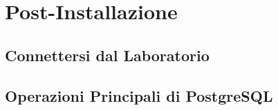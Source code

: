 \chapter{Post-Installazione}

\section{Connettersi dal Laboratorio}

\section{Operazioni Principali di PostgreSQL}
